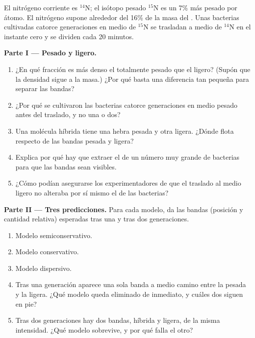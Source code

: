 \begin{problem}
\label{pb:g11:dna-replication:1}
El nitrógeno corriente es $^{14}$N; el isótopo pesado $^{15}$N es un
7\% más pesado por átomo. El nitrógeno supone alrededor del 16\% de la
masa del . Unas bacterias cultivadas catorce generaciones en medio
de $^{15}$N se trasladan a medio de $^{14}$N en el instante cero y se
dividen cada 20 minutos.

\medskip
\noindent\textbf{Parte I --- Pesado y ligero.}
\begin{enumerate}
  \item ¿En qué fracción es más denso el  totalmente pesado que el
        ligero? (Supón que la densidad sigue a la masa.) ¿Por qué basta
        una diferencia tan pequeña para separar las bandas?
  \item ¿Por qué se cultivaron las bacterias catorce generaciones en
        medio pesado antes del traslado, y no una o dos?
  \item Una molécula híbrida tiene una hebra pesada y otra ligera.
        ¿Dónde flota respecto de las bandas pesada y ligera?
  \item Explica por qué hay que extraer el  de un número muy grande
        de bacterias para que las bandas sean visibles.
  \item ¿Cómo podían asegurarse los experimentadores de que el traslado
        al medio ligero no alteraba por sí mismo el  de las
        bacterias?
\end{enumerate}

\medskip
\noindent\textbf{Parte II --- Tres predicciones.}
Para cada modelo, da las bandas (posición y cantidad relativa)
esperadas tras una y tras dos generaciones.
\begin{enumerate}[resume]
  \item Modelo semiconservativo.
  \item Modelo conservativo.
  \item Modelo dispersivo.
  \item Tras una generación aparece una sola banda a medio camino entre
        la pesada y la ligera. ¿Qué modelo queda eliminado de
        inmediato, y cuáles dos siguen en pie?
  \item Tras dos generaciones hay dos bandas, híbrida y ligera, de la
        misma intensidad. ¿Qué modelo sobrevive, y por qué falla el
        otro?
\end{enumerate}


\end{problem}
